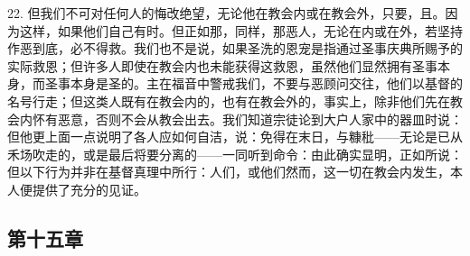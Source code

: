 22. 但我们不可对任何人的悔改绝望，无论他在教会内或在教会外，只要，且。因为这样，如果他们自己有时。但正如那，同样，那恶人，无论在内或在外，若坚持作恶到底，必不得救。我们也不是说，如果圣洗的恩宠是指通过圣事庆典所赐予的实际救恩；但许多人即使在教会内也未能获得这救恩，虽然他们显然拥有圣事本身，而圣事本身是圣的。主在福音中警戒我们，不要与恶顾问交往，他们以基督的名号行走；但这类人既有在教会内的，也有在教会外的，事实上，除非他们先在教会内怀有恶意，否则不会从教会出去。我们知道宗徒论到大户人家中的器皿时说：但他更上面一点说明了各人应如何自洁，说：免得在末日，与糠秕——无论是已从禾场吹走的，或是最后将要分离的——一同听到命令：由此确实显明，正如所说：但以下行为并非在基督真理中所行：人们，或他们然而，这一切在教会内发生，本人便提供了充分的见证。\par


\subsection{第十五章\newline{}}

